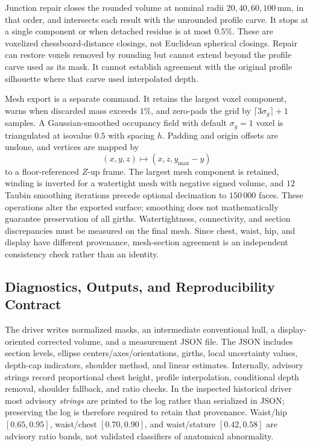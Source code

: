 \documentclass[journal]{IEEEtran}
\begin{document}
Junction repair closes the rounded volume at nominal radii $20,40,60,100$\,mm, in that order, and intersects each result with the unrounded profile carve. It stops at a single component or when detached residue is at most $0.5\%$. These are voxelized chessboard-distance closings, not Euclidean spherical closings. Repair can restore voxels removed by rounding but cannot extend beyond the profile carve used as its mask. It cannot establish agreement with the original profile silhouette where that carve used interpolated depth.

Mesh export is a separate command. It retains the largest voxel component, warns when discarded mass exceeds $1\%$, and zero-pads the grid by $\lceil3\sigma_g\rceil+1$ samples. A Gaussian-smoothed occupancy field with default $\sigma_g=1$ voxel is triangulated at isovalue $0.5$ with spacing $h$. Padding and origin offsets are undone, and vertices are mapped by
\begin{equation}
(x,y,z)\mapsto(x,z,y_{\max}-y)
\end{equation}
to a floor-referenced $Z$-up frame. The largest mesh component is retained, winding is inverted for a watertight mesh with negative signed volume, and $12$ Taubin smoothing iterations precede optional decimation to $150\,000$ faces. These operations alter the exported surface; smoothing does not mathematically guarantee preservation of all girths. Watertightness, connectivity, and section discrepancies must be measured on the final mesh. Since chest, waist, hip, and display have different provenance, mesh-section agreement is an independent consistency check rather than an identity.

\subsection{Diagnostics, Outputs, and Reproducibility Contract}
\label{subsec:reliability_flags}
The driver writes normalized masks, an intermediate conventional hull, a display-oriented corrected volume, and a measurement JSON file. The JSON includes section levels, ellipse centers/axes/orientations, girths, local uncertainty values, depth-cap indicators, shoulder method, and linear estimates. Internally, advisory strings record proportional chest height, profile interpolation, conditional depth removal, shoulder fallback, and ratio checks. In the inspected historical driver most advisory \emph{strings} are printed to the log rather than serialized in JSON; preserving the log is therefore required to retain that provenance. Waist/hip $[0.65,0.95]$, waist/chest $[0.70,0.90]$, and waist/stature $[0.42,0.58]$ are advisory ratio bands, not validated classifiers of anatomical abnormality.
\end{document}
